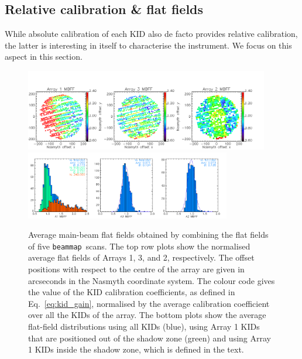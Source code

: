 \documentclass[traditionalabstract]{aa}
\newcommand{\bm}{{\tt beammap}}
\newcommand{\lp}[1]{#1}
\begin{document}
{\subsection{Relative calibration \& flat fields}
\label{se:flat_field}
While absolute calibration of each KID also de facto provides
relative calibration, the latter is interesting in itself to
characterise the instrument. We focus on this aspect in this
section.

\begin{figure}[!thbp] 
\begin{center}
  \includegraphics[width=0.95\textwidth]{Figures/Average_main_beam_flat_field_N2R9_10.png}
  \includegraphics[width=0.8\textwidth]{Figures/Histo_average_main_beam_flat_field_N2R9_10.png}
\caption[Average main beam flat fields]{Average main-beam flat fields
  obtained by combining the flat fields of five
  \bm\ scans. The top row plots show the normalised average flat fields of Arrays
  1, 3, and 2, respectively. {\lp The offset positions with respect to the centre of
  the array are given in arcseconds in the Nasmyth coordinate
  system. The colour code gives the value of the KID calibration
  coefficients, as defined in Eq.~\ref{eq:kid_gain}, normalised by the
  average calibration coefficient over all the
  KIDs of the array.} The bottom plots
  show the average flat-field distributions using all KIDs (blue),
  using Array 1 KIDs that are positioned out of the shadow zone
  (green) and using Array 1 KIDs inside the shadow zone, which is
  defined in the text.}
 \label{fig:avg_mbff}
\end{center}
\end{figure}

}
\end{document}
